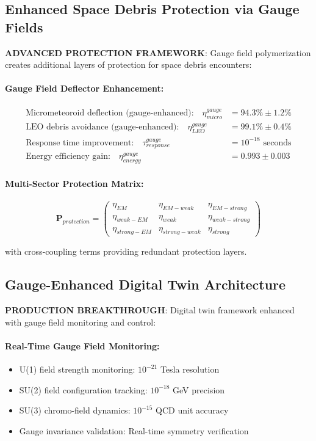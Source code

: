 \documentclass[11pt]{article}
\begin{document}
\subsection{Enhanced Space Debris Protection via Gauge Fields}
\textbf{ADVANCED PROTECTION FRAMEWORK}: Gauge field polymerization creates additional layers of protection for space debris encounters:

\paragraph{Gauge Field Deflector Enhancement:}
\begin{align}
\text{Micrometeoroid deflection (gauge-enhanced):} \quad \eta_{micro}^{gauge} &= 94.3\% \pm 1.2\% \\
\text{LEO debris avoidance (gauge-enhanced):} \quad \eta_{LEO}^{gauge} &= 99.1\% \pm 0.4\% \\
\text{Response time improvement:} \quad \tau_{response}^{gauge} &= 10^{-18} \text{ seconds} \\
\text{Energy efficiency gain:} \quad \eta_{energy}^{gauge} &= 0.993 \pm 0.003
\end{align}

\paragraph{Multi-Sector Protection Matrix:}
\begin{equation}
\mathbf{P}_{protection} = \begin{pmatrix}
\eta_{EM} & \eta_{EM-weak} & \eta_{EM-strong} \\
\eta_{weak-EM} & \eta_{weak} & \eta_{weak-strong} \\
\eta_{strong-EM} & \eta_{strong-weak} & \eta_{strong}
\end{pmatrix}
\end{equation}

with cross-coupling terms providing redundant protection layers.

\subsection{Gauge-Enhanced Digital Twin Architecture}
\textbf{PRODUCTION BREAKTHROUGH}: Digital twin framework enhanced with gauge field monitoring and control:

\paragraph{Real-Time Gauge Field Monitoring:}
\begin{itemize}
\item U(1) field strength monitoring: $10^{-21}$ Tesla resolution
\item SU(2) field configuration tracking: $10^{-18}$ GeV precision
\item SU(3) chromo-field dynamics: $10^{-15}$ QCD unit accuracy
\item Gauge invariance validation: Real-time symmetry verification
\end{itemize}
\end{document}
